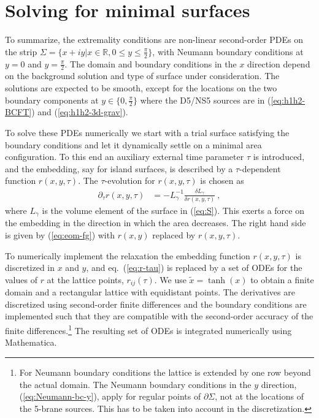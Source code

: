 \documentclass[aps,prd,11pt,notitlepage,longbibliography,nofootinbib,tightenlines,preprintnumbers]{revtex4-1}
\begin{document}
\section{Solving for minimal surfaces}\label{sec:numerics}

To summarize, the extremality conditions are non-linear second-order PDEs on the strip $\Sigma=\lbrace x+iy\vert x\in\mathds{R}, 0\leq y\leq\frac{\pi}{2}\rbrace$, with Neumann boundary conditions at $y=0$ and $y=\frac{\pi}{2}$.
The domain and boundary conditions in the $x$ direction depend on the background solution and type of surface under consideration.
%
The solutions are expected to be smooth, except for the locations on the two boundary components at $y\in\lbrace 0,\frac{\pi}{2}\rbrace$ where the D5/NS5 sources are in (\ref{eq:h1h2-BCFT}) and (\ref{eq:h1h2-3d-grav}).

To solve these PDEs numerically we start with a trial surface satisfying the boundary conditions and let it dynamically settle on a minimal area configuration.
To this end an auxiliary external time parameter $\tau$ is introduced, and the embedding, say for island surfaces, is described by a $\tau$-dependent function $r(x,y,\tau)$.
The $\tau$-evolution for $r(x,y,\tau)$ is chosen as
\begin{align}\label{eq:r-tau}
	\partial_\tau r(x,y,\tau)&=-L_\gamma^{-1}\frac{\delta L_\gamma}{\delta r(x,y,\tau)}~,
\end{align}
where $L_\gamma$ is the volume element of the surface in (\ref{eq:S}).
This exerts a force on the embedding in the direction in which the area decreases.
The right hand side is given by (\ref{eq:eom-fg}) with $r(x,y)$ replaced by $r(x,y,\tau)$.

To numerically implement the relaxation the embedding function $r(x,y,\tau)$ is discretized in $x$ and $y$, and eq.~(\ref{eq:r-tau}) is replaced by a set of ODEs for the values of $r$ at the lattice points, $r_{ij}(\tau)$.
We use $\tilde x = \tanh(x)$ to obtain a finite domain and a rectangular lattice with equidistant points. The derivatives are discretized using second-order finite differences and the boundary conditions are implemented such that they are compatible with the second-order accuracy of the finite differences.\footnote{%
For Neumann boundary conditions the lattice is extended by one row beyond the actual domain. The Neumann boundary conditions in the $y$ direction, (\ref{eq:Neumann-bc-y}), apply for regular points of $\partial\Sigma$, not at the locations of the 5-brane sources. This has to be taken into account in the discretization.}
The resulting set of ODEs is integrated numerically using Mathematica.
\end{document}
